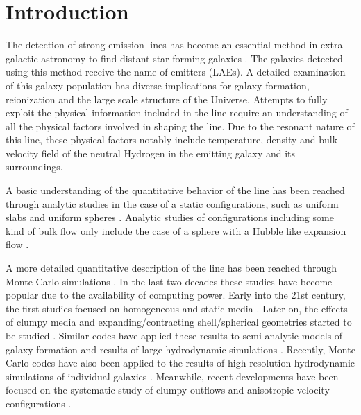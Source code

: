 \documentclass{emulateapj}
\newcommand{\ly}{{\ifmmode{{\rm Ly}\alpha~}\else{Ly$\alpha$~}\fi}}
\begin{document}
\section{Introduction}
\label{sec:intro}

The detection of strong \ly emission lines has become an essential
method in extra-galactic astronomy to find distant star-forming
galaxies
\citep{PartridgePeebles,Rhoads00,Gawiser2007,Koehler2007,Ouchi08,Yamada2012,Schenker2012,Finkelstein2013}.
The galaxies detected using this method receive the 
name of \ly emitters (LAEs). 
A detailed examination of this galaxy population has diverse
implications for galaxy formation, reionization and the large scale
structure of the Universe.  
Attempts to fully exploit the physical information included in the \ly
line require an understanding of all the physical factors involved in
shaping the  line. 
Due to the resonant nature of this line, these physical factors
notably include temperature, density and bulk velocity field of the
neutral Hydrogen in the emitting galaxy and its surroundings.


A basic understanding of the quantitative behavior of the \ly line
has been reached through analytic studies in the case of a static
configurations, such as uniform slabs
\citep{Adams72,Harrington73,Neufeld90} and uniform spheres
\citep{Dijkstra06}. 
Analytic studies of configurations including some kind of bulk flow
only include the case of a sphere with a Hubble like expansion flow
\citep{LoebRybicki}.  

A more detailed quantitative description of the \ly line has been
reached through Monte Carlo simulations \citep{Auer68,Avery68,Adams72}. 
In the last two decades these studies have become popular due to the
availability of computing power. 
Early into the 21st century, the first
studies focused on homogeneous and static media
\citep{Ahn00,Ahn01,Zheng02}. 
Later on, the effects of clumpy media \citep{Hansen06} and
expanding/contracting shell/spherical geometries started to be studied
\citep{Ahn03,Verhamme06,Dijkstra06}.  
Similar codes have applied these results to semi-analytic models of
galaxy formation \citep{Orsi12, Garel2012} and results of large
hydrodynamic simulations \citep{CLARA,Forero12,Behrens13}. 
Recently, Monte Carlo codes have also been applied to the results of
high resolution hydrodynamic simulations of individual galaxies
\citep{Laursen09,Barnes11,Verhamme12,Yajima12}. 
Meanwhile, recent  developments have been focused on the systematic
study of clumpy outflows \citep{DijkstraKramer} and anisotropic
velocity configurations \citep{Zheng2013}. 
\end{document}
